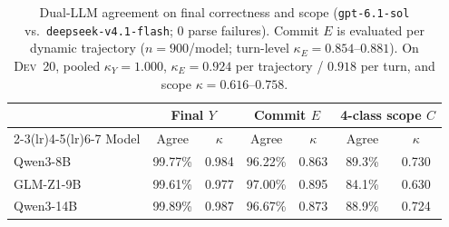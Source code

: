 \begin{table}[!t]
\centering
\caption{Dual-LLM agreement on final correctness and scope (\texttt{gpt-6.1-sol} vs.\ \texttt{deepseek-v4.1-flash}; 0 parse failures). Commit $E$ is evaluated per dynamic trajectory ($n{=}900$/model; turn-level $\kappa_E{=}0.854$--$0.881$). On \textsc{Dev}~20, pooled $\kappa_Y{=}1.000$, $\kappa_E{=}0.924$ per trajectory / $0.918$ per turn, and scope $\kappa{=}0.616$--$0.758$.}
\label{tab:exp4a_calibration}
\footnotesize
\setlength{\tabcolsep}{3.8pt}
\renewcommand{\arraystretch}{0.96}
\begin{tabular*}{\textwidth}{@{\extracolsep{\fill}}lcccccc@{}}
\toprule
 & \multicolumn{2}{c}{Final $Y$} & \multicolumn{2}{c}{Commit $E$} & \multicolumn{2}{c}{4-class scope $C$} \\
\cmidrule(lr){2-3}\cmidrule(lr){4-5}\cmidrule(lr){6-7}
Model & Agree & $\kappa$ & Agree & $\kappa$ & Agree & $\kappa$ \\
\midrule
Qwen3-8B & 99.77\% & 0.984 & 96.22\% & 0.863 & 89.3\% & 0.730 \\
GLM-Z1-9B & 99.61\% & 0.977 & 97.00\% & 0.895 & 84.1\% & 0.630 \\
Qwen3-14B & 99.89\% & 0.987 & 96.67\% & 0.873 & 88.9\% & 0.724 \\
\bottomrule
\end{tabular*}
\end{table}
